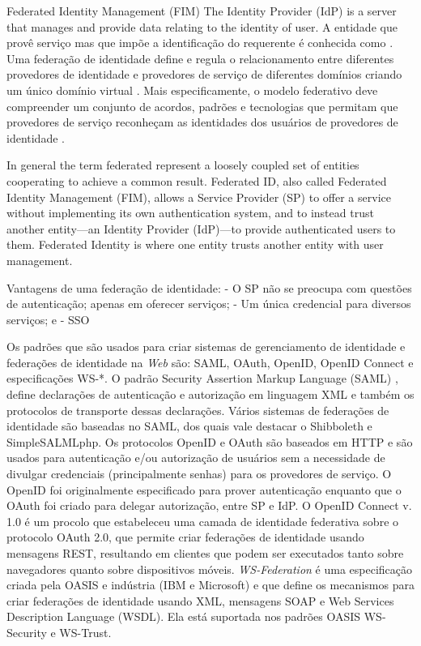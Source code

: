 \documentclass{doublecol-new}
\begin{document}
Federated Identity Management (FIM) The Identity Provider (IdP) is a server that manages and provide data relating to the identity of user. A entidade que provê serviço mas que impõe a identificação do requerente é conhecida como . Uma federação de identidade define e regula o relacionamento entre diferentes provedores de identidade e provedores de serviço de diferentes domínios criando um único domínio virtual \cite{perez2014identity} \cite{cao2010survey}. Mais especificamente, o modelo federativo deve compreender um conjunto de acordos, padrões e tecnologias que permitam que provedores de serviço reconheçam as identidades dos usuários de provedores de identidade \cite{torres2013survey}.
	
In general the term federated represent a loosely coupled set of entities cooperating to achieve a common result.
Federated ID, also called Federated Identity Management (FIM), allows a Service Provider (SP) to offer a service without implementing its own authentication system, and to instead trust another entity—an Identity Provider (IdP)—to provide authenticated users to them.
Federated Identity is where one entity trusts another entity with user management.
	
	Vantagens de uma federação de identidade:
	- O SP não se preocupa com questões de autenticação; apenas em oferecer serviços;
	- Um única credencial para diversos serviços; e
	- SSO
	
	
Os padrões que são usados para criar sistemas de gerenciamento de identidade e federações de identidade na \textit{Web} são:  SAML, OAuth, OpenID, OpenID Connect e especificações WS-*. O padrão Security Assertion Markup Language (SAML) \cite{ragouzis2008security}, define declarações de autenticação e autorização em linguagem XML e também os protocolos de transporte dessas declarações. Vários sistemas de federações de identidade são baseadas no SAML, dos quais vale destacar o Shibboleth \cite{erdos2002shibboleth} e SimpleSALMLphp. Os protocolos OpenID\cite{openid2015} e OAuth\cite{hardt2012oauth} são baseados em HTTP e são usados para autenticação e/ou autorização de usuários sem a necessidade de divulgar credenciais (principalmente senhas) para os provedores de serviço. O OpenID foi originalmente especificado para prover autenticação enquanto que o OAuth foi criado para delegar autorização, entre SP e IdP. O OpenID Connect v. 1.0 \cite{sakimura2014openidconnect} é um procolo que estabeleceu uma camada de identidade federativa sobre o protocolo OAuth 2.0, que permite criar federações de identidade usando mensagens REST, resultando em clientes que podem ser executados tanto sobre navegadores quanto sobre dispositivos móveis. \textit{WS-Federation} \cite{goodner2009ws} é uma especificação criada pela OASIS e indústria (IBM e Microsoft) e que define os mecanismos para criar federações de identidade usando XML, mensagens SOAP e Web Services Description Language (WSDL). Ela está suportada nos padrões OASIS WS-Security e WS-Trust.
	
\end{document}
